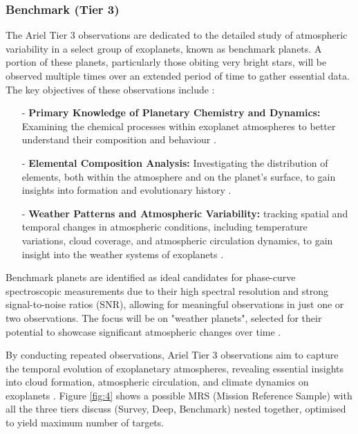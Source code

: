 \documentclass[12pt]{article}
\begin{document}
\subsubsection{Benchmark (Tier 3)}

The Ariel Tier 3 observations are dedicated to the detailed study of atmospheric variability in a select group of exoplanets, known as benchmark planets. A portion of these planets, particularly those obiting very bright stars, will be observed multiple times over an extended period of time to gather essential data. The key objectives of these observations include \cite{salvignol2024ariel}:

\begin{itemize}
    \item[-] \textbf{Primary Knowledge of Planetary Chemistry and Dynamics:} Examining the chemical processes within exoplanet atmospheres to better understand their composition and behaviour \cite{salvignol2024ariel}.
    \item[-] \textbf{Elemental Composition Analysis:} Investigating the distribution of elements, both within the atmosphere and on the planet's surface, to gain insights into formation and evolutionary history \cite{salvignol2024ariel}.
    \item[-] \textbf{Weather Patterns and Atmospheric Variability:} tracking spatial and temporal changes in atmospheric conditions, including temperature variations, cloud coverage, and atmospheric circulation dynamics, to gain insight into the weather systems of exoplanets \cite{salvignol2024ariel}.
\end{itemize}

Benchmark planets are identified as ideal candidates for phase-curve spectroscopic measurements due to their high spectral resolution and strong signal-to-noise ratios (SNR), allowing for meaningful observations in just one or two observations.
The focus will be on "weather planets", selected for their potential to showcase significant atmospheric changes over time \cite{salvignol2024ariel}.

By conducting repeated observations, Ariel Tier 3 observations aim to capture the temporal evolution of exoplanetary atmospheres, revealing essential insights into cloud formation, atmospheric circulation, and climate dynamics on exoplanets \cite{salvignol2024ariel}.
Figure \ref{fig:4} shows a possible MRS (Mission Reference Sample) with all the three tiers discuss (Survey, Deep, Benchmark) nested together, optimised to yield maximum number of targets. 
\end{document}
